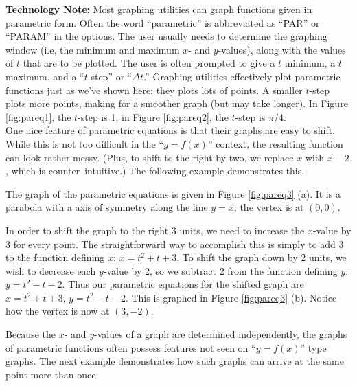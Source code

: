 \noindent\textbf{Technology Note:} Most graphing utilities can graph functions given in parametric form. Often the word ``parametric'' is abbreviated as ``PAR'' or ``PARAM'' in the  options. The user usually needs to determine the graphing window (i.e, the minimum and maximum $x$- and $y$-values), along with the values of $t$ that are to be plotted. The user is often prompted to give a $t$ minimum, a $t$ maximum, and a ``$t$-step'' or ``$\Delta t$.'' Graphing utilities effectively plot parametric functions just as we've shown here: they plots lots of points. A smaller $t$-step plots more points, making for a smoother graph (but may take longer). In Figure \ref{fig:pareq1}, the $t$-step is 1; in Figure \ref{fig:pareq2}, the $t$-step is $\pi/4$.\\

One nice feature of parametric equations is that their graphs are easy to shift. While this is not too difficult in the ``$y=f(x)$'' context, the resulting function can look rather messy. (Plus, to shift to the right by two, we replace $x$ with $x-2$, which is counter--intuitive.) The following example demonstrates this.\\

{The graph of the parametric equations is given in Figure \ref{fig:pareq3} (a). It is a parabola with a axis of symmetry along the line $y=x$; the vertex is at $(0,0)$. 

In order to shift the graph to the right 3 units, we need to increase the $x$-value by 3 for every point. The straightforward way to accomplish this is simply to add 3 to the function defining $x$: $x = t^2+t+3$. To shift the graph down by 2 units, we wish to decrease each $y$-value by 2, so we subtract 2 from the function defining $y$: $y = t^2-t-2$. Thus our parametric equations for the shifted graph are $x=t^2+t+3$, $y=t^2-t-2$. This is graphed in Figure \ref{fig:pareq3} (b). Notice how the vertex is now at $(3,-2)$. 


Because the $x$- and $y$-values of a graph are determined independently, the graphs of parametric functions often possess features not seen on ``$y=f(x)$'' type graphs. The next example demonstrates how such graphs can arrive at the same point more than once.
}\\

